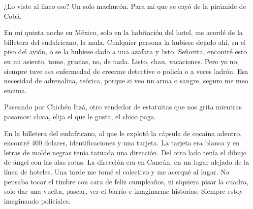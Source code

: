 \documentclass[12pt,twoside,openright,a5paper]{book}
\begin{document}
\vspace{0.5cm}

\hrulefill\hspace{0.2cm} \decofourleft\decofourright \hspace{0.2cm} \hrulefill
\vspace{0.5cm}

¿Lo viste al flaco ese? Un solo machucón. Para mi que se cayó de la
pirámide de Cobá.


\vspace{0.5cm}
\afterpage{}
\hrulefill\hspace{0.2cm} \decofourleft\decofourright \hspace{0.2cm} \hrulefill
\vspace{0.5cm}

En mi quinta noche en México, solo en la habitación del hotel, me acordé
de la billetera del sudafricano, la mula. Cualquier persona la hubiese
dejado ahí, en el piso del avión, o se la hubiese dado a una azafata
y listo. Señorita, encontré esto en mi asiento, tome, gracias, no, de
nada. Listo, chau, vacaciones. Pero yo no, siempre tuve esa enfermedad de
creerme detective o policía o a veces ladrón. Esa necesidad de adrenalina,
teórica, porque si veo un arma o sangre, seguro me meo encima.

\vspace{0.5cm}

\hrulefill\hspace{0.2cm} \decofourleft\decofourright \hspace{0.2cm} \hrulefill
\vspace{0.5cm}

Paseando por Chichén Itzá, otro vendedor de estatuitas que nos grita mientras
pasamos: chica, elija el que le gusta, el chico paga.

\vspace{0.5cm}

\hrulefill\hspace{0.2cm} \decofourleft\decofourright \hspace{0.2cm} \hrulefill
\vspace{0.5cm}

En la billetera del sudafricano, al que le explotó la cápsula
de cocaína adentro, encontré 400 dolares, identificaciones y una
tarjeta. La tarjeta era blanca y en letras de molde negras tenía tatuada
una dirección. Del otro lado tenía el dibujo de ángel con las alas
rotas. La dirección era en Cancún, en un lugar alejado de la línea de
hoteles. Una tarde me tomé el colectivo y me acerqué al lugar. No pensaba
tocar el timbre con cara de feliz cumpleaños, ni siquiera pisar la cuadra,
solo dar una vuelta, pasear, ver el barrio e imaginarme historias. Siempre
estoy imaginando policiales.
\end{document}
